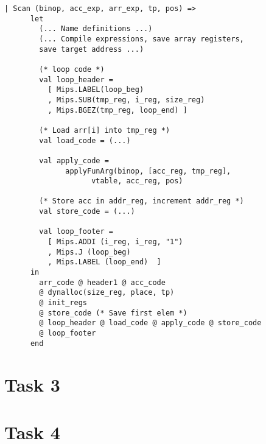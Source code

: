 \documentclass[10pt]{article}
\begin{document}
\begin{Verbatim}[frame=single]
  | Scan (binop, acc_exp, arr_exp, tp, pos) =>
      let
        (... Name definitions ...)
        (... Compile expressions, save array registers, 
        save target address ...)

        (* loop code *)
        val loop_header =
          [ Mips.LABEL(loop_beg)
          , Mips.SUB(tmp_reg, i_reg, size_reg)
          , Mips.BGEZ(tmp_reg, loop_end) ]
  
        (* Load arr[i] into tmp_reg *)
        val load_code = (...)
  
        val apply_code =
              applyFunArg(binop, [acc_reg, tmp_reg], 
              		vtable, acc_reg, pos)
  
        (* Store acc in addr_reg, increment addr_reg *)
        val store_code = (...)
              
        val loop_footer =
          [ Mips.ADDI (i_reg, i_reg, "1")
          , Mips.J (loop_beg)
          , Mips.LABEL (loop_end)  ]
      in
        arr_code @ header1 @ acc_code
        @ dynalloc(size_reg, place, tp)
        @ init_regs
        @ store_code (* Save first elem *)
        @ loop_header @ load_code @ apply_code @ store_code 
        @ loop_footer
      end
\end{Verbatim}


\section{Task 3}
\section{Task 4}

\begin{Verbatim}[frame=single]

\end{Verbatim}
\end{document}
